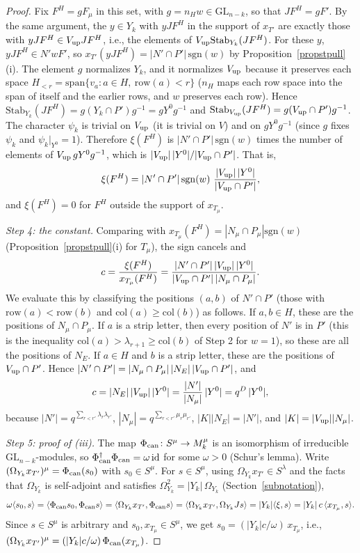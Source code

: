 \documentclass[11pt, letterpaper]{amsart}
\theoremstyle{definition}
\theoremstyle{remark}
\newcommand{\GL}{\mathrm{GL}}
\newcommand{\sgn}{\mathrm{sgn}}
\newcommand{\row}{\mathrm{row}}
\newcommand{\col}{\mathrm{col}}
\newcommand{\Stab}{\mathrm{Stab}}
\begin{document}
\begin{proof}
Fix $F^H=gF_\mu$ in this set, with $g=n_Hw\in\GL_{n-k}$, so that $JF^H=gF'$. By the same argument, the $y\in Y_k$ with $yJF^H$ in the support of $x_{T'}$ are exactly those with $yJF^H\in V_{\rm up}JF^H$, i.e., the elements of $V_{\rm up}\Stab_{Y_k}(JF^H)$. For these $y$, $yJF^H\in N'wF'$, so $x_{T'}(yJF^H)=|N'\cap P'|\,\sgn(w)$ by Proposition~\ref{propstpull}(i). The element $g$ normalizes $Y_k$, and it normalizes $V_{\rm up}$ because it preserves each space $H_{<r}=\mathrm{span}\{v_a:a\in H,\ \row(a)<r\}$ ($n_H$ maps each row space into the span of itself and the earlier rows, and $w$ preserves each row). Hence $\Stab_{Y_k}(JF^H)=g(Y_k\cap P')g^{-1}=gY^0g^{-1}$ and $\Stab_{V_{\rm up}}(JF^H)=g(V_{\rm up}\cap P')g^{-1}$. The character $\psi_k$ is trivial on $V_{\rm up}$ (it is trivial on $V$) and on $gY^0g^{-1}$ (since $g$ fixes $\psi_k$ and $\psi_k|_{Y^0}=1$). Therefore $\xi(F^H)$ is $|N'\cap P'|\,\sgn(w)$ times the number of elements of $V_{\rm up}\,gY^0g^{-1}$, which is $|V_{\rm up}|\,|Y^0|/|V_{\rm up}\cap P'|$. That is,
\[
\xi(F^H)=|N'\cap P'|\,\sgn(w)\ \frac{|V_{\rm up}|\,|Y^0|}{|V_{\rm up}\cap P'|},
\]
and $\xi(F^H)=0$ for $F^H$ outside the support of $x_{T_\mu}$.

\emph{Step 4: the constant.} Comparing with $x_{T_\mu}(F^H)=|N_\mu\cap P_\mu|\sgn(w)$ (Proposition~\ref{propstpull}(i) for $T_\mu$), the sign cancels and
\[
c=\frac{\xi(F^H)}{x_{T_\mu}(F^H)}=\frac{|N'\cap P'|\,|V_{\rm up}|\,|Y^0|}{|V_{\rm up}\cap P'|\,|N_\mu\cap P_\mu|}.
\]
We evaluate this by classifying the positions $(a,b)$ of $N'\cap P'$ (those with $\row(a)<\row(b)$ and $\col(a)\ge\col(b)$) as follows. If $a,b\in H$, these are the positions of $N_\mu\cap P_\mu$. If $a$ is a strip letter, then every position of $N'$ is in $P'$ (this is the inequality $\col(a)>\lambda_{r+1}\ge\col(b)$ of Step 2 for $w=1$), so these are all the positions of $N_E$. If $a\in H$ and $b$ is a strip letter, these are the positions of $V_{\rm up}\cap P'$. Hence $|N'\cap P'|=|N_\mu\cap P_\mu|\,|N_E|\,|V_{\rm up}\cap P'|$, and
\[
c=|N_E|\,|V_{\rm up}|\,|Y^0|=\frac{|N'|}{|N_\mu|}\,|Y^0|=q^{D}\,|Y^0|,
\]
because $|N'|=q^{\sum_{r<r'}\lambda_r\lambda_{r'}}$, $|N_\mu|=q^{\sum_{r<r'}\mu_r\mu_{r'}}$, $|K||N_E|=|N'|$, and $|K|=|V_{\rm up}||N_\mu|$.

\emph{Step 5: proof of (iii).} The map $\Phi_{\rm can}\colon S^\mu\to M_k^\mu$ is an isomorphism of irreducible $\GL_{n-k}$-modules, so $\Phi_{\rm can}^\dagger\Phi_{\rm can}=\omega\,\mathrm{id}$ for some $\omega>0$ (Schur's lemma). Write $(\Omega_{Y_k}x_{T'})^\mu=\Phi_{\rm can}(s_0)$ with $s_0\in S^\mu$. For $s\in S^\mu$, using $\Omega_{Y_k}x_{T'}\in S^\lambda$ and the facts that $\Omega_{Y_k}$ is self-adjoint and satisfies $\Omega_{Y_k}^2=|Y_k|\,\Omega_{Y_k}$ (Section~\ref{subnotation}),
\[
\omega\langle s_0,s\rangle=\langle\Phi_{\rm can}s_0,\Phi_{\rm can}s\rangle=\langle \Omega_{Y_k}x_{T'},\Phi_{\rm can}s\rangle=\langle \Omega_{Y_k}x_{T'},\Omega_{Y_k}Js\rangle=|Y_k|\langle\xi,s\rangle=|Y_k|\,c\,\langle x_{T_\mu},s\rangle .
\]
Since $s\in S^\mu$ is arbitrary and $s_0,x_{T_\mu}\in S^\mu$, we get $s_0=(|Y_k|c/\omega)\,x_{T_\mu}$, i.e., $(\Omega_{Y_k}x_{T'})^\mu=(|Y_k|c/\omega)\,\Phi_{\rm can}(x_{T_\mu})$.
\end{proof}
\end{document}
